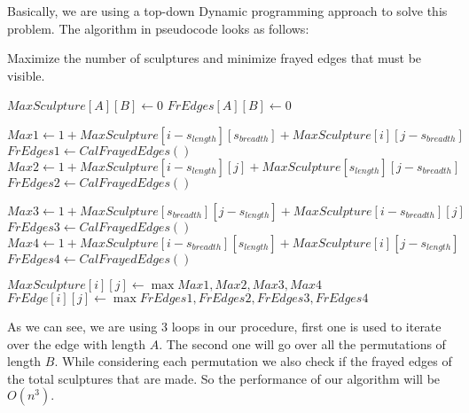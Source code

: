 \documentclass[8pt]{article}
\begin{document}
Basically, we are using a top-down Dynamic programming approach to solve this problem.
The algorithm in pseudocode looks as follows:
\begin{algorithm}
\caption{Maximize the number of sculptures and minimize frayed edges that must be visible.}\label{euclid}
\begin{algorithmic}[1]

\State $MaxSculpture[A][B] \leftarrow 0$
\State $FrEdges[A][B] \leftarrow 0$

                \State $Max1 \leftarrow 1 + MaxSculpture[i-s_{length}][s_{breadth}] + MaxSculpture[i][j-s_{breadth}]$
                \State $FrEdges1 \leftarrow CalFrayedEdges()$
                \State $Max2 \leftarrow 1 + MaxSculpture[i-s_{length}][j] + MaxSculpture[s_{length}][j-s_{breadth}]$
                \State $FrEdges2 \leftarrow CalFrayedEdges()$
            
            \EndIf
                \State $Max3 \leftarrow 1 + MaxSculpture[s_{breadth}][j-s_{length}] + MaxSculpture[i-s_{breadth}][j]$
                \State $FrEdges3 \leftarrow CalFrayedEdges()$
                \State $Max4 \leftarrow 1 + MaxSculpture[i-s_{breadth}][s_{length}] + MaxSculpture[i][j-s_{length}]$
                \State $FrEdges4 \leftarrow CalFrayedEdges()$
            
            \EndIf
        \State $MaxSculpture[i][j] \leftarrow \max {Max1, Max2, Max3, Max4}$
        \State $FrEdge[i][j] \leftarrow \max {FrEdges1, FrEdges2, FrEdges3, FrEdges4}$
        \EndFor
    \EndFor
\EndFor

\State {}

\EndProcedure
\end{algorithmic}
\end{algorithm}

As we can see,  we are using 3 loops in our procedure, first one is used to iterate over the edge with length $A$. The second one will go over all the permutations of length $B$. While considering each permutation we also check if the frayed edges of the total sculptures that are made. So the performance of our algorithm will be $O(n^3).$
\end{document}
